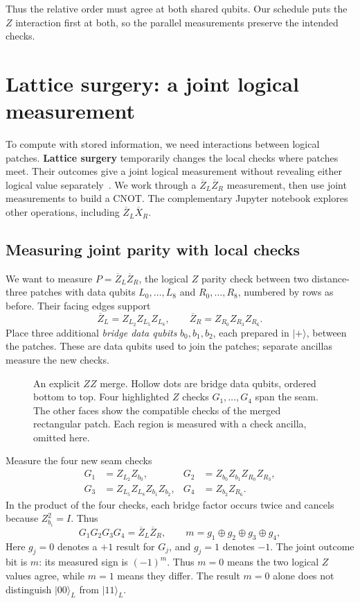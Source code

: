 \documentclass[11pt,a4paper]{article}
\newcommand{\ket}[1]{\lvert #1\rangle}
\newcommand{\XL}{\overline{X}}
\newcommand{\ZL}{\overline{Z}}
\begin{document}
Thus the relative order must agree at both shared qubits. Our schedule puts the $Z$ interaction first at both, so the parallel measurements preserve the intended checks.

\section{Lattice surgery: a joint logical measurement}
To compute with stored information, we need interactions between logical patches. \textbf{Lattice surgery} temporarily changes the local checks where patches meet. Their outcomes give a joint logical measurement without revealing either logical value separately~\cite{horsman}. We work through a $\ZL_L\ZL_R$ measurement, then use joint measurements to build a CNOT. The complementary Jupyter notebook explores other operations, including $\ZL_L\XL_R$.

\subsection{Measuring joint parity with local checks}
We want to measure $P=\ZL_L\ZL_R$, the logical $Z$ parity check between two distance-three patches with data qubits
$L_0,\ldots,L_8$ and $R_0,\ldots,R_8$, numbered by rows
as before. Their facing edges support
\[
\ZL_L=Z_{L_2}Z_{L_5}Z_{L_8},
\qquad
\ZL_R=Z_{R_0}Z_{R_3}Z_{R_6}.
\]
Place three additional \emph{bridge data qubits} $b_0,b_1,b_2$, each prepared in $\ket{+}$, between the patches. 
These are data qubits used to join the
patches; separate ancillas measure the new checks.

\begin{figure}[!ht]
\centering\physicalseam
\caption{An explicit $ZZ$ merge. Hollow dots are bridge data qubits, ordered bottom to top. Four highlighted $Z$ checks $G_1,\ldots,G_4$ span the seam. The other faces show the compatible checks of the merged rectangular patch. Each region is measured with a check ancilla, omitted here.}
\label{fig:seam}
\end{figure}

Measure the four new seam checks
\begin{equation}\label{eq:seam}
\begin{aligned}
G_1&=Z_{L_2}Z_{b_0},&
G_2&=Z_{b_0}Z_{b_1}Z_{R_0}Z_{R_3},\\
G_3&=Z_{L_5}Z_{L_8}Z_{b_1}Z_{b_2},&
G_4&=Z_{b_2}Z_{R_6}.
\end{aligned}
\end{equation}
In the product of the four checks, each bridge factor occurs twice and cancels because $Z_{b_i}^2=I$. Thus
\begin{equation}\label{eq:seamproduct}
G_1G_2G_3G_4=\ZL_L\ZL_R,
\qquad m=g_1\oplus g_2\oplus g_3\oplus g_4,
\end{equation}
Here $g_j=0$ denotes a $+1$ result for $G_j$, and $g_j=1$ denotes $-1$. The joint outcome bit is $m$: its measured sign is $(-1)^m$. Thus $m=0$ means the two logical $Z$ values agree, while $m=1$ means they differ.
The result $m=0$ alone does not distinguish $\ket{00}_L$ from $\ket{11}_L$.
\end{document}
